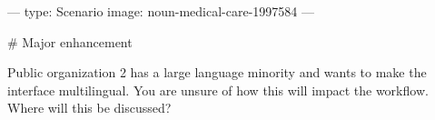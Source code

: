 ---
type: Scenario
image: noun-medical-care-1997584
---

# Major enhancement

Public organization 2 has a large language minority and wants to make the interface multilingual. You are unsure of how this will impact the workflow. Where will this be discussed?
